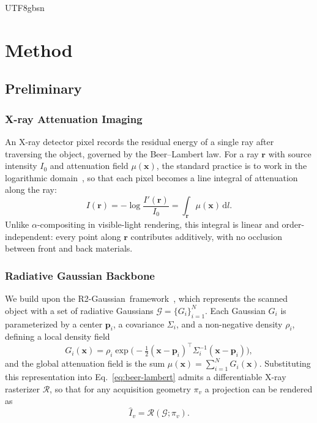 \documentclass{egpubl}
\newcommand{\rtwo}{R2-Gaussian}
\begin{document}
\begin{CJK*}{UTF8}{gbsn}
\section{Method}
\label{sec:method}

\subsection{Preliminary}
\label{sec:preliminary}

\subsubsection{X-ray Attenuation Imaging}
An X-ray detector pixel records the residual energy of a single ray after traversing the object, governed by the Beer--Lambert law. For a ray $\mathbf{r}$ with source intensity $I_0$ and attenuation field $\mu(\mathbf{x})$, the standard practice is to work in the logarithmic domain~\cite{kak2001principles}, so that each pixel becomes a line integral of attenuation along the ray:
\begin{equation}
I(\mathbf{r})=-\log\frac{I'(\mathbf{r})}{I_0}=\int_{\mathbf{r}}\mu(\mathbf{x})\,\mathrm{d}l.
\label{eq:beer-lambert}
\end{equation}
Unlike $\alpha$-compositing in visible-light rendering, this integral is linear and order-independent: every point along $\mathbf{r}$ contributes additively, with no occlusion between front and back materials.

\subsubsection{Radiative Gaussian Backbone}
We build upon the \rtwo\ framework~\cite{hu2024r2}, which represents the scanned object with a set of radiative Gaussians $\mathcal{G}=\{G_i\}_{i=1}^{N}$. Each Gaussian $G_i$ is parameterized by a center $\mathbf{p}_i$, a covariance $\Sigma_i$, and a non-negative density $\rho_i$, defining a local density field
\begin{equation}
G_i(\mathbf{x})=\rho_i\exp\!\Big(-\tfrac{1}{2}(\mathbf{x}-\mathbf{p}_i)^{\!\top}\Sigma_i^{-1}(\mathbf{x}-\mathbf{p}_i)\Big),
\label{eq:radiative-gaussian}
\end{equation}
and the global attenuation field is the sum $\mu(\mathbf{x})=\sum_{i=1}^{N}G_i(\mathbf{x})$. Substituting this representation into Eq.~\eqref{eq:beer-lambert} admits a differentiable X-ray rasterizer $\mathcal{R}$, so that for any acquisition geometry $\pi_v$ a projection can be rendered as
\begin{equation}
\hat{I}_v=\mathcal{R}(\mathcal{G};\pi_v).
\label{eq:renderer}
\end{equation}


\end{CJK*}
\end{document}
